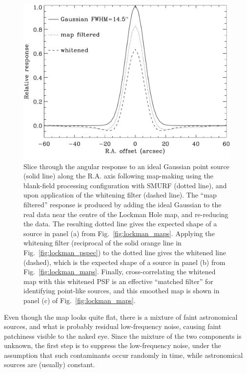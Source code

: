 \documentclass[useAMS,usenatbib,nofootinbib]{mn2e}
\begin{document}
\begin{figure}
\centering
\includegraphics[width=\linewidth]{lockman_psf}
\caption{Slice through the angular response to an ideal Gaussian point
  source (solid line) along the R.A. axis following map-making using
  the blank-field processing configuration with SMURF (dotted line),
  and upon application of the whitening filter (dashed line). The
  ``map filtered'' response is produced by adding the ideal Gaussian
  to the real data near the centre of the Lockman Hole map, and
  re-reducing the data. The resulting dotted line gives the expected
  shape of a source in panel (a) from
  Fig.~\ref{fig:lockman_maps}. Applying the whitening filter
  (reciprocal of the solid orange line in
  Fig.~\ref{fig:lockman_pspec}) to the dotted line gives the whitened
  line (dashed), which is the expected shape of a source in panel (b)
  from Fig.~\ref{fig:lockman_maps}. Finally, cross-correlating the
  whitened map with this whitened PSF is an effective ``matched
  filter'' for identifying point-like sources, and this smoothed map
  is shown in panel (c) of Fig.~\ref{fig:lockman_maps}.}
\label{fig:lockman_psf}
\end{figure}

Even though the map looks quite flat, there is a mixture of faint
astronomical sources, and what is probably residual low-frequency
noise, causing faint patchiness visible to the naked eye. Since the
mixture of the two components is unknown, the first step is to
suppress the low-frequency noise, under the assumption that such
contaminants occur randomly in time, while astronomical sources are
(usually) constant.
\end{document}
